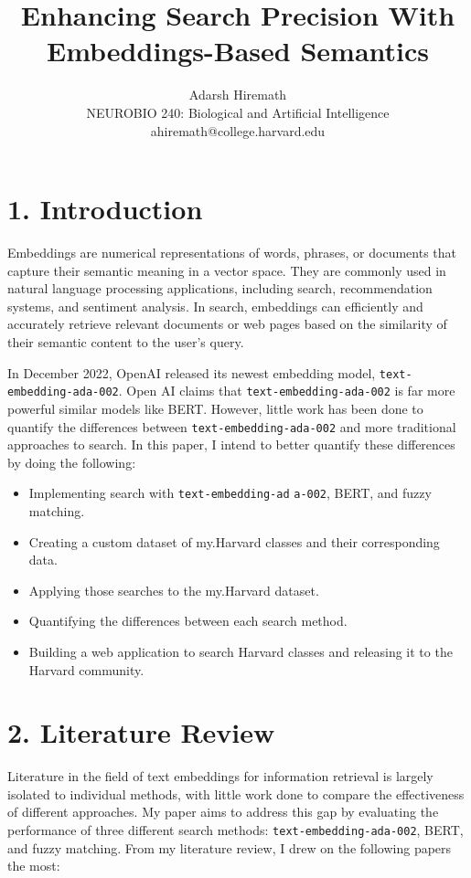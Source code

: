 \documentclass[
	a4paper, %
	10pt, %
	unnumberedsections, %
	twoside, %
]{LTJournalArticle}
\title{Enhancing Search Precision With Embeddings-Based Semantics} %
\author{%
	Adarsh Hiremath \\
	NEUROBIO 240: Biological and Artificial Intelligence \\
	ahiremath@college.harvard.edu
}
\begin{document}
\maketitle %


\section{1. Introduction}

Embeddings are numerical representations of words, phrases, or documents that capture their semantic meaning in a vector space. They are commonly used in natural language processing applications, including search, recommendation systems, and sentiment analysis. In search, embeddings can efficiently and accurately retrieve relevant documents or web pages based on the similarity of their semantic content to the user's query.

In December 2022, OpenAI released its newest embedding model, \texttt{text-embedding-ada-002}. Open AI claims that \texttt{text-embedding-ada-002} is far more powerful similar models like BERT. However, little work has been done to quantify the differences between \texttt{text-embedding-ada-002} and more traditional approaches to search. In this paper, I intend to better quantify these differences by doing the following: 
\begin{itemize}
	\item Implementing search with \texttt{text-embedding-ad}
	\texttt{a-002}, BERT, and fuzzy matching. 
	\item Creating a custom dataset of my.Harvard classes and their corresponding data.
	\item Applying those searches to the my.Harvard dataset.
	\item Quantifying the differences between each search method. 
	\item Building a web application to search Harvard classes and releasing it to the Harvard community. 
\end{itemize}

\section{2. Literature Review}

Literature in the field of text embeddings for information retrieval is largely isolated to individual methods, with little work done to compare the effectiveness of different approaches. My paper aims to address this gap by evaluating the performance of three different search methods: \texttt{text-embedding-ada-002}, BERT, and fuzzy matching. From my literature review, I drew on the following papers the most: 
\end{document}
